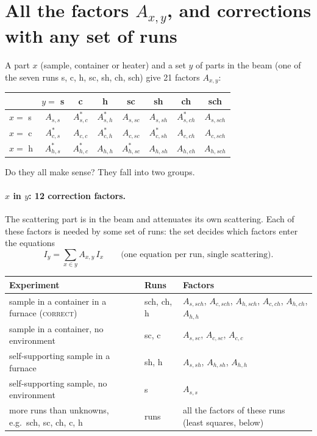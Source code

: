 \section{All the factors $A_{x,y}$, and corrections with any set of runs}
\label{sec:all-factors}

A part $x$ (sample, container or heater) and a set $y$ of parts in the beam (one of the seven runs s, c, h, sc, sh, ch, sch) give
21 factors $A_{x,y}$:
\begin{center}\small
\begin{tabular}{@{}lccccccc@{}}
  \toprule & $y=$ s & c & h & sc & sh & ch & sch \\ \midrule
  $x=$ s & $A_{s,s}$ & $A_{s,c}^{*}$ & $A_{s,h}^{*}$ & $A_{s,sc}$ & $A_{s,sh}$ & $A_{s,ch}^{*}$ & $A_{s,sch}$ \\
  $x=$ c & $A_{c,s}^{*}$ & $A_{c,c}$ & $A_{c,h}^{*}$ & $A_{c,sc}$ & $A_{c,sh}^{*}$ & $A_{c,ch}$ & $A_{c,sch}$ \\
  $x=$ h & $A_{h,s}^{*}$ & $A_{h,c}^{*}$ & $A_{h,h}$ & $A_{h,sc}^{*}$ & $A_{h,sh}$ & $A_{h,ch}$ & $A_{h,sch}$ \\ \bottomrule
\end{tabular}
\end{center}
Do they all make sense? They fall into two groups.

\paragraph{$x$ in $y$: 12 correction factors.} The scattering part is in the beam and attenuates its own scattering. Each of these
factors is needed by some set of runs: the set decides which factors enter the equations
\begin{equation}
  I_y = \sum_{x\in y} A_{x,y}\, I_x \qquad\text{(one equation per run, single scattering)}.
  \label{eq:general}
\end{equation}
\begin{center}\small
\begin{tabular}{@{}>{\raggedright\arraybackslash}p{4.6cm}>{\raggedright\arraybackslash}p{2.0cm}>{\raggedright\arraybackslash}p{7.6cm}@{}}
  \toprule \textbf{Experiment} & \textbf{Runs} & \textbf{Factors} \\ \midrule
  sample in a container in a furnace (\textsc{correct}) & sch, ch, h & $A_{s,sch}$, $A_{c,sch}$, $A_{h,sch}$, $A_{c,ch}$, $A_{h,ch}$, $A_{h,h}$ \\
  sample in a container, no environment & sc, c & $A_{s,sc}$, $A_{c,sc}$, $A_{c,c}$ \\
  self-supporting sample in a furnace & sh, h & $A_{s,sh}$, $A_{h,sh}$, $A_{h,h}$ \\
  self-supporting sample, no environment & s & $A_{s,s}$ \\
  more runs than unknowns, e.g.\ sch, sc, ch, c, h & 5 runs & all the factors of these runs (least squares, below) \\ \bottomrule
\end{tabular}
\end{center}

